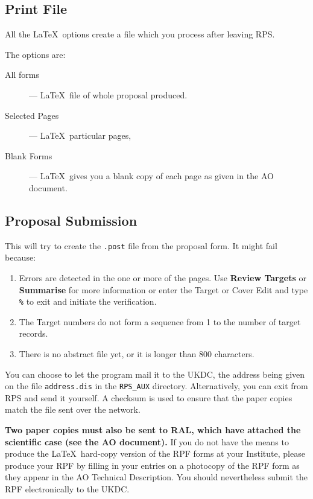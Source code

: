 \subsection{Print File}

All the \LaTeX\ options create a file which you process after leaving RPS.

The options are:

\begin{description}

\item [All forms] --- \LaTeX\ file of whole proposal produced.

\item [Selected Pages] --- \LaTeX\ particular pages,

\item [Blank Forms] --- \LaTeX\ gives you a blank copy of each page
as given in the AO document.

\end{description}

\subsection{Proposal Submission}

This will try to create the {\tt .post} file from the proposal form. It might
fail because:

\begin{enumerate}

\item Errors are detected in the one or more of the pages. Use {\bf
Review Targets} or {\bf Summarise} for more information or enter the
Target or Cover Edit and type {\tt \%} to exit and initiate the
verification.

\item The Target numbers do not form a sequence from 1 to the number of
target records.

\item There is no abstract file yet, or it is longer than 800 characters.

\end{enumerate}

You can choose to let the program mail it to the UKDC, the address being
given on the file {\tt address.dis} in the {\tt RPS\_AUX} directory.
Alternatively, you can exit from RPS and
send it yourself.  A checksum is used to ensure that the paper copies
match the file sent over the network.

{\bf Two paper copies must also be sent to RAL, which have attached the
scientific case (see the AO document). } If you do not have the means
to produce the \LaTeX\ hard-copy version of the RPF forms at your
Institute, please produce your RPF by filling in your entries on a
photocopy of the RPF form as they appear in the AO Technical
Description. You should nevertheless submit the RPF electronically to
the UKDC.

